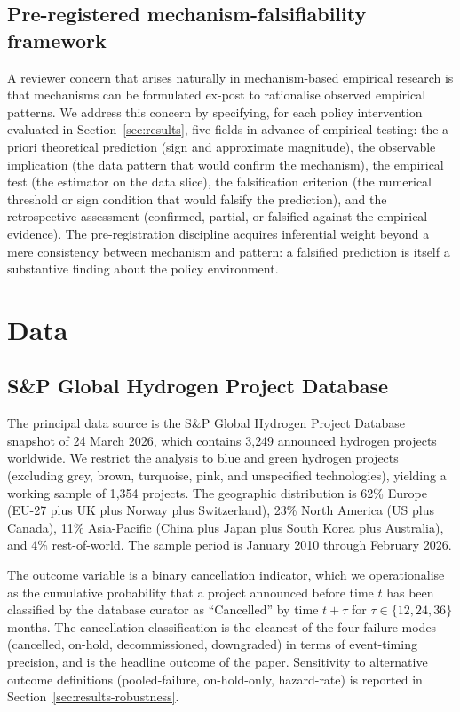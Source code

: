 \documentclass[12pt,a4paper]{article}
\theoremstyle{plain}
\theoremstyle{definition}
\begin{document}
\subsection{Pre-registered mechanism-falsifiability framework}
\label{sec:framework-falsifiability}

A reviewer concern that arises naturally in mechanism-based empirical research is that mechanisms can be formulated ex-post to rationalise observed empirical patterns. We address this concern by specifying, for each policy intervention evaluated in Section~\ref{sec:results}, five fields in advance of empirical testing: the a priori theoretical prediction (sign and approximate magnitude), the observable implication (the data pattern that would confirm the mechanism), the empirical test (the estimator on the data slice), the falsification criterion (the numerical threshold or sign condition that would falsify the prediction), and the retrospective assessment (confirmed, partial, or falsified against the empirical evidence). The pre-registration discipline acquires inferential weight beyond a mere consistency between mechanism and pattern: a falsified prediction is itself a substantive finding about the policy environment.

\section{Data}
\label{sec:data}

\subsection{S\&P Global Hydrogen Project Database}
\label{sec:data-sp}

The principal data source is the S\&P Global Hydrogen Project Database snapshot of 24 March 2026, which contains 3{,}249 announced hydrogen projects worldwide. We restrict the analysis to blue and green hydrogen projects (excluding grey, brown, turquoise, pink, and unspecified technologies), yielding a working sample of 1{,}354 projects. The geographic distribution is 62\% Europe (EU-27 plus UK plus Norway plus Switzerland), 23\% North America (US plus Canada), 11\% Asia-Pacific (China plus Japan plus South Korea plus Australia), and 4\% rest-of-world. The sample period is January 2010 through February 2026.

The outcome variable is a binary cancellation indicator, which we operationalise as the cumulative probability that a project announced before time $t$ has been classified by the database curator as ``Cancelled'' by time $t + \tau$ for $\tau \in \{12, 24, 36\}$ months. The cancellation classification is the cleanest of the four failure modes (cancelled, on-hold, decommissioned, downgraded) in terms of event-timing precision, and is the headline outcome of the paper. Sensitivity to alternative outcome definitions (pooled-failure, on-hold-only, hazard-rate) is reported in Section~\ref{sec:results-robustness}.
\end{document}

